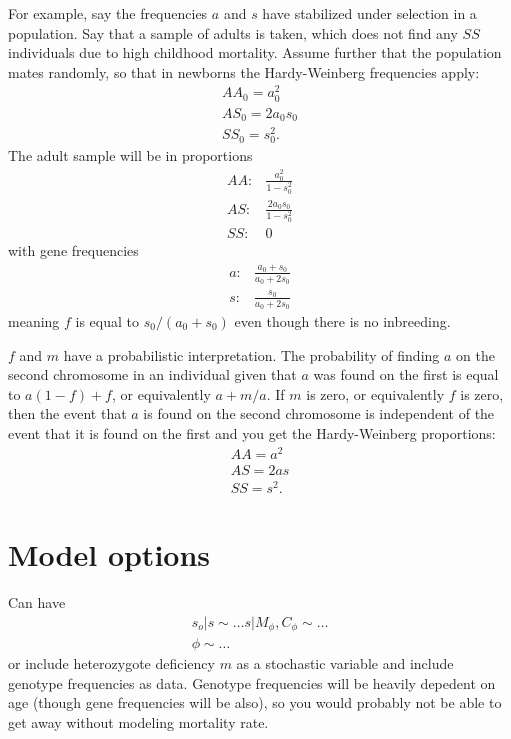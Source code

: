 \documentclass[a4paper]{article}
\begin{document}
For example, say the frequencies $a$ and $s$ have stabilized under selection in a population. Say that a sample of adults is taken, which does not find any $SS$ individuals due to high childhood mortality. Assume further that the population mates randomly, so that in newborns the Hardy-Weinberg frequencies apply:
\begin{eqnarray*}
    AA_0 = a_0^2\\
    AS_0 = 2a_0s_0\\
    SS_0 = s_0^2.
\end{eqnarray*}
The adult sample will be in proportions 
\begin{eqnarray*}
    AA:&\frac{a_0^2}{1-s_0^2}\\
    AS:&\frac{2a_0s_0}{1-s_0^2}\\
    SS:&0
\end{eqnarray*}
with gene frequencies
\begin{eqnarray*}
    a:&\frac{a_0+s_0}{a_0+2s_0}\\
    s:&\frac{s_0}{a_0+2s_0}
\end{eqnarray*}
meaning $f$ is equal to $s_0/(a_0+s_0)$ even though there is no inbreeding.

\bigskip
$f$ and $m$ have a probabilistic interpretation. The probability of finding $a$ on the second chromosome in an individual given that $a$ was found on the first is equal to $a(1-f)+f$, or equivalently $a+m/a$. If $m$ is zero, or equivalently $f$ is zero, then the event that $a$ is found on the second chromosome is independent of the event that it is found on the first and you get the Hardy-Weinberg proportions:
\begin{eqnarray*}
    AA=a^2\\
    AS=2as\\
    SS=s^2.
\end{eqnarray*}

\section{Model options} %
\label{sec:model_options}

Can have
\begin{eqnarray*}
    s_o|s\sim\ldots
    s|M_\phi,C_\phi\sim\ldots\\
    \phi\sim\ldots
\end{eqnarray*}
or include heterozygote deficiency $m$ as a stochastic variable and include genotype frequencies as data. Genotype frequencies will be heavily depedent on age (though gene frequencies will be also), so you would probably not be able to get away without modeling mortality rate.

\end{document}
